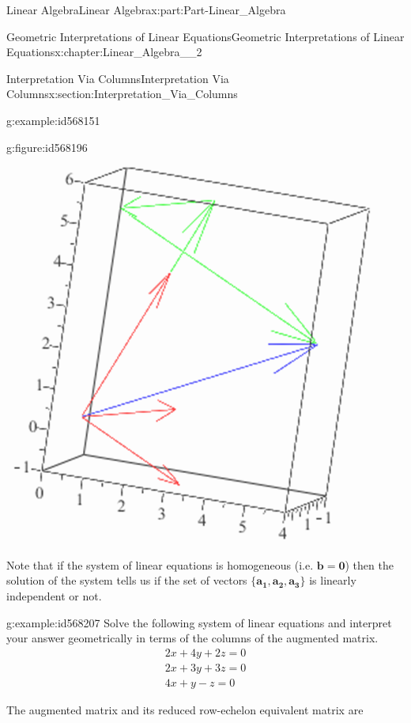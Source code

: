 \documentclass[oneside,10pt,]{book}
\numberwithin{equation}{section}
\begin{document}
\begin{partptx}{Linear Algebra}{}{Linear Algebra}{}{}{x:part:Part-Linear_Algebra}
\begin{chapterptx}{Geometric Interpretations of Linear Equations}{}{Geometric Interpretations of Linear Equations}{}{}{x:chapter:Linear_Algebra__2}
\begin{sectionptx}{Interpretation Via Columns}{}{Interpretation Via Columns}{}{}{x:section:Interpretation_Via_Columns}
\begin{example}{}{g:example:id568151}
\begin{figureptx}{}{g:figure:id568196}{}
\begin{image}{0.2}{0.6}{0.2}
\includegraphics[width=\linewidth]{./LinearAlgebra/Images/2/figure6.png}
\end{image}%
\tcblower
\end{figureptx}%
 Note that if the system of linear equations is homogeneous (i.e. \(\mathbf{b=0}\)) then the solution of the system tells us if the set of vectors \(\{\mathbf{a_1, a_2, a_3}\}\)  is linearly independent or not.%
\end{example}
\begin{example}{}{g:example:id568207}%
Solve the following system of linear equations and interpret your answer geometrically in terms of the columns of the augmented matrix.%
\begin{gather*}
2x+4y+2z=0\\
2x+3y+3z=0\\
4x+y-z=0
\end{gather*}
%
\par\smallskip%
\noindent\hypertarget{g:solution:id568214}{}The augmented matrix and its reduced row-echelon equivalent matrix are%
\begin{equation*}

\end{equation*}
\end{example}
\end{sectionptx}
\end{chapterptx}
\end{partptx}
\end{document}
